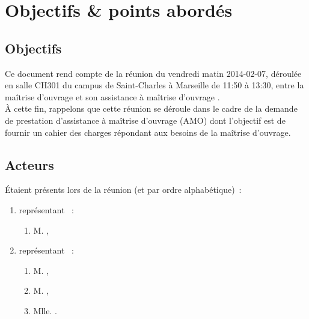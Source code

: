\documentclass[11pt,fleqn]{report}
\begin{document}
\ZMakeCover


\chapter{Objectifs \& points abordés}

\section{Objectifs}
Ce document rend compte de la réunion du vendredi matin 2014-02-07, déroulée en salle CH301 du campus de Saint-Charles à Marseille de 11:50 à 13:30, entre la maîtrise d'ouvrage \mo et son assistance à maîtrise d'ouvrage \amo.
\\
À cette fin, rappelons que cette réunion se déroule dans le cadre de la demande de prestation d'assistance à maîtrise d'ouvrage (AMO) dont l'objectif est de fournir un cahier des charges répondant aux besoins de la maîtrise d'ouvrage.

\section{Acteurs}
Étaient présents lors de la réunion (et par ordre alphabétique)~:
\begin{enumerate}
	\item représentant \mo~:
	\begin{enumerate}
		\item M. \Agopian,
	\end{enumerate}
	\item représentant \amo~:
	\begin{enumerate}
		\item M. \Balde,
		\item M. \Cadon,
		\item Mlle. \Toure.
	\end{enumerate}
\end{enumerate}
\end{document}
